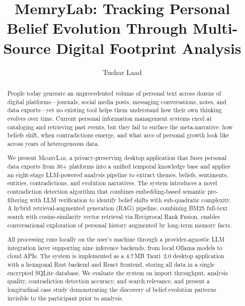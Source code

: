 \documentclass[manuscript,review]{acmart}
\begin{document}
\title{MemryLab: Tracking Personal Belief Evolution Through Multi-Source Digital Footprint Analysis}

\author{Tushar Laad}

\begin{abstract}
People today generate an unprecedented volume of personal text across dozens of digital platforms---journals, social media posts, messaging conversations, notes, and data exports---yet no existing tool helps them understand how their own thinking evolves over time.
Current personal information management systems excel at cataloging and retrieving past events, but they fail to surface the meta-narrative: how beliefs shift, when contradictions emerge, and what arcs of personal growth look like across years of heterogeneous data.

We present \textsc{MemryLab}, a privacy-preserving desktop application that fuses personal data exports from 30+ platforms into a unified temporal knowledge base and applies an eight-stage LLM-powered analysis pipeline to extract themes, beliefs, sentiments, entities, contradictions, and evolution narratives.
The system introduces a novel contradiction detection algorithm that combines embedding-based semantic pre-filtering with LLM verification to identify belief shifts with sub-quadratic complexity.
A hybrid retrieval-augmented generation (RAG) pipeline, combining BM25 full-text search with cosine-similarity vector retrieval via Reciprocal Rank Fusion, enables conversational exploration of personal history augmented by long-term memory facts.

All processing runs locally on the user's machine through a provider-agnostic LLM integration layer supporting nine inference backends, from local Ollama models to cloud APIs.
The system is implemented as a 4.7\,MB Tauri~2.0 desktop application with a hexagonal Rust backend and React frontend, storing all data in a single encrypted SQLite database.
We evaluate the system on import throughput, analysis quality, contradiction detection accuracy, and search relevance, and present a longitudinal case study demonstrating the discovery of belief evolution patterns invisible to the participant prior to analysis.

\end{abstract}
\end{document}
